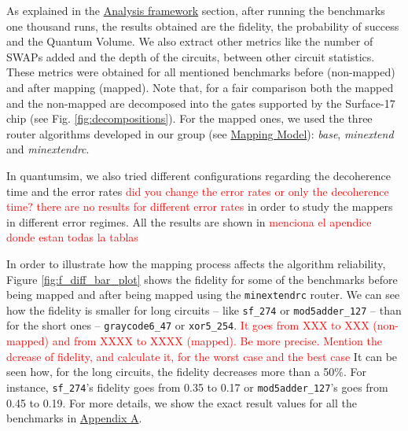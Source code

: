 As explained in the \href{chapter-4.org}{Analysis framework} section, after running the benchmarks one thousand runs, the results obtained are the fidelity, the probability of success and the Quantum Volume.
We also extract other metrics like the number of SWAPs added and the depth of the circuits, between other circuit statistics.
These metrics were obtained for all mentioned benchmarks before (non-mapped) and after mapping (mapped). Note that, for a fair comparison both the mapped and the non-mapped are  decomposed into the gates supported by  the Surface-17 chip (see Fig. \ref{fig:decompositions}). For the mapped ones, we used the three router algorithms developed in our group (see \hyperref[sec:org19dc500]{Mapping Model}): \textit{base}, \textit{minextend} and \textit{minextendrc}.

In quantumsim, we also tried different configurations regarding the decoherence time and the error rates \textcolor{red}{did you change the error rates or only the decoherence time? there are no results for different error rates} in order to study the mappers in different error regimes.
All the results are shown in \textcolor{red}{menciona el apendice donde estan todas la tablas}


In order to illustrate how the mapping process affects the algorithm reliability, Figure \ref{fig:f_diff_bar_plot} shows the fidelity for some of the benchmarks before being mapped and after being mapped using the \texttt{minextendrc} router.
We can see how the fidelity is smaller for long circuits -- like \texttt{sf\_274} or \texttt{mod5adder\_127} -- than for the short ones -- \texttt{graycode6\_47} or \texttt{xor5\_254}.
\textcolor{red}{It goes from XXX to XXX (non-mapped) and from XXXX to XXXX (mapped).}
\textcolor{red}{Be more precise. Mention the dcrease of fidelity, and calculate it, for the worst case and the best case}
It can be seen how, for the long circuits, the fidelity decreases more than a 50\%.
For instance, \texttt{sf\_274}'s fidelity goes from 0.35 to 0.17 or \texttt{mod5adder\_127}'s goes from 0.45 to 0.19.
For more details, we show the exact result values for all the benchmarks in \href{appendix-1.org}{Appendix A}.

